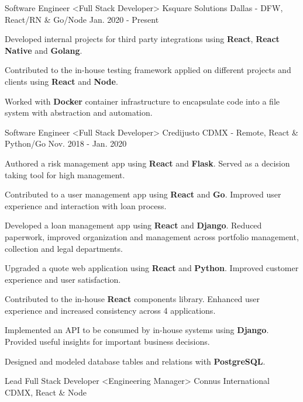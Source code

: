 \begin{cventries}
  \cventry
    {Software Engineer <Full Stack Developer>}
    {Ksquare Solutions}
    {Dallas - DFW, React/RN \& Go/Node}
    {Jan. 2020 - Present}
    {
      \begin{cvitems}
        \item {Developed internal projects for third party integrations using \textbf{React}, \textbf{React Native} and \textbf{Golang}.}
        \item {Contributed to the in-house testing framework applied on different projects and clients using \textbf{React} and \textbf{Node}.}
        \item {Worked with \textbf{Docker} container infrastructure to encapsulate code into a file system with abstraction and automation.}
      \end{cvitems}
    }
  \cventry
    {Software Engineer <Full Stack Developer>}
    {Credijusto}
    {CDMX - Remote, React \& Python/Go}
    {Nov. 2018 - Jan. 2020}
    {
      \begin{cvitems}
        \item {Authored a risk management app using \textbf{React} and \textbf{Flask}. Served as a decision taking tool for high management.}
        \item {Contributed to a user management app using \textbf{React} and \textbf{Go}. Improved user experience and interaction with loan process.}
        \item {Developed a loan management app using \textbf{React} and \textbf{Django}. Reduced paperwork, improved organization and management across portfolio management, collection and legal departments.}
        \item {Upgraded a quote web application using \textbf{React} and \textbf{Python}. Improved customer experience and user satisfaction.}
        \item {Contributed to the in-house \textbf{React} components library. Enhanced user experience and increased consistency across 4 applications.}
        \item {Implemented an API to be consumed by  in-house systems using \textbf{Django}. Provided useful insights for important business decisions.}
        \item {Designed and modeled database tables and relations with \textbf{PostgreSQL}.}
      \end{cvitems}
    }
  \cventry
    {Lead Full Stack Developer <Engineering Manager>}
    {Connus International}
    {CDMX, React \& Node}

\end{cventries}
